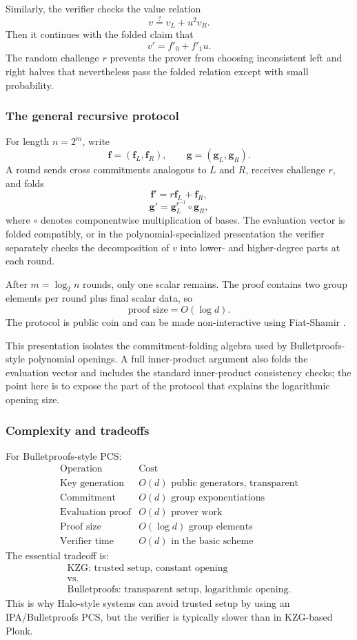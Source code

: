 \documentclass[11pt]{article}
\begin{document}
Similarly, the verifier checks the value relation
\[
    v\stackrel{?}{=}v_L+u^2v_R.
\]
Then it continues with the folded claim that
\[
    v'=f'_0+f'_1u.
\]
The random challenge $r$ prevents the prover from choosing inconsistent left and right halves that nevertheless pass the folded relation except with small probability.

\subsubsection{The general recursive protocol}

For length $n=2^m$, write
\[
    \mathbf f=(\mathbf f_L,\mathbf f_R),
    \qquad
    \mathbf g=(\mathbf g_L,\mathbf g_R).
\]
A round sends cross commitments analogous to $L$ and $R$, receives challenge $r$, and folds
\[
    \mathbf f' = r\mathbf f_L+\mathbf f_R,
\]
\[
    \mathbf g' = \mathbf g_L^{r^{-1}}\circ \mathbf g_R,
\]
where $\circ$ denotes componentwise multiplication of bases. The evaluation vector is folded compatibly, or in the polynomial-specialized presentation the verifier separately checks the decomposition of $v$ into lower- and higher-degree parts at each round.

After $m=\log_2 n$ rounds, only one scalar remains. The proof contains two group elements per round plus final scalar data, so
\[
    \text{proof size}=O(\log d).
\]
The protocol is public coin and can be made non-interactive using Fiat-Shamir \cite{FiatShamir1986}.

This presentation isolates the commitment-folding algebra used by Bulletproofs-style polynomial openings. A full inner-product argument also folds the evaluation vector and includes the standard inner-product consistency checks; the point here is to expose the part of the protocol that explains the logarithmic opening size.

\subsubsection{Complexity and tradeoffs}

For Bulletproofs-style PCS:
\[
\begin{array}{c|c}
\text{Operation} & \text{Cost}\\
\hline
\text{Key generation} & O(d)\text{ public generators, transparent}\\
\text{Commitment} & O(d)\text{ group exponentiations}\\
\text{Evaluation proof} & O(d)\text{ prover work}\\
\text{Proof size} & O(\log d)\text{ group elements}\\
\text{Verifier time} & O(d)\text{ in the basic scheme}
\end{array}
\]
The essential tradeoff is:
\[
\begin{array}{c}
\text{KZG: trusted setup, constant opening}\\[0.2em]
\text{vs.}\\[0.2em]
\text{Bulletproofs: transparent setup, logarithmic opening}.
\end{array}
\]
This is why Halo-style systems can avoid trusted setup by using an IPA/Bulletproofs PCS, but the verifier is typically slower than in KZG-based Plonk.
\end{document}
